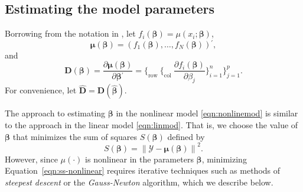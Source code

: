 \documentclass[cmfont,usenames,dvipsnames,leqno]{afit-etd}\usepackage[]{graphicx}\usepackage[]{color}
\newcommand{\norm}[1]{\left\|#1\right\|}
\newcommand{\trans}{\ensuremath{^\prime}}
\newcommand{\bc}[1]{\ensuremath{\bm{\mathcal{#1}}}}
\newcommand{\wh}[1]{\ensuremath{\widehat{#1}}}
\begin{document}
\subsection{Estimating the model parameters}
Borrowing from the notation in \citet{seber_nonlinear_2003}, let $f_i(\bm{\beta}) = \mu(x_i; \bm{\beta})$,
\begin{equation*}
  \bm{\mu}(\bm{\beta}) = \left( f_1(\bm{\beta}), \dotsc, f_N(\bm{\beta}) \right)\trans,
\end{equation*}
and
\begin{equation*}
  \bm{D}(\bm{\beta}) = \frac{\partial\bm{\mu}(\bm{\beta})}{\partial\bm{\beta}\trans} = \Bigg\lbrace_\text{row } \bigg\lbrace_\text{col } \frac{\partial f_i(\bm{\beta})}{\partial\beta_j} \bigg\rbrace_{i = 1}^n \Bigg\rbrace_{j = 1}^p.
\end{equation*}
For convenience, let $\widehat{\bm{D}} = \bm{D}(\wh{\bm{\beta}})$.

The approach to estimating $\bm{\beta}$ in the nonlinear model \eqref{eqn:nonlinemod} is similar to the approach in the linear model \eqref{eqn:linmod}. That is, we choose the value of $\bm{\beta}$ that minimizes the sum of squares $S(\bm{\beta})$ defined by
\begin{equation}
\label{eqn:ss-nonlinear}
  S(\bm{\beta}) = \norm{\bc{Y} - \bm{\mu}(\bm{\beta})}^2.
\end{equation}
However, since $\mu(\cdot)$ is nonlinear in the parameters $\bm{\beta}$, minimizing Equation~\eqref{eqn:ss-nonlinear} requires iterative techniques such as methods of \textit{steepest descent} or the \textit{Gauss-Newton} algorithm, which we describe below. 
\end{document}
